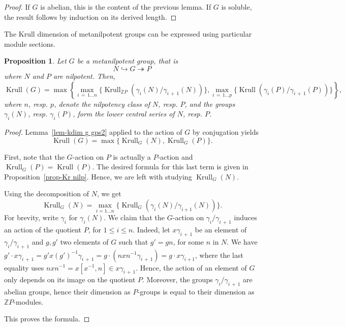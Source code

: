\documentclass[11pt]{article}
\newtheorem{prop}[theo]{Proposition}
\theoremstyle{definition}
\numberwithin{equation}{section}
\numberwithin{figure}{section}
\numberwithin{table}{section}
\newcommand{\Z}{\mathbb{Z}}
\DeclareMathOperator{\krull}{Krull}
\begin{document}
\begin{proof}
If $G$ is abelian, this is the content of the previous lemma. If $G$ is soluble, the result follows by induction on its derived length.
\end{proof}


The Krull dimension of metanilpotent groups can be expressed using particular module sections.

\begin{prop}
Let $G$ be a metanilpotent group, that is
\begin{equation*}
N \hookrightarrow G \twoheadrightarrow P
\end{equation*}
where $N$ and $P$ are nilpotent. Then,
\begin{equation*}
\krull(G) = \max\!\left\{\!\max\limits_{i\,=\,1\dots n} \big\{\!\krull_{\Z P}(\gamma_i(N)/\gamma_{i\,+\,1}(N))\big\}, \max\limits_{i\,=\,1\dots p} \big\{\!\krull(\gamma_i(P)/\gamma_{i\,+\,1}(P))\big\}\!\right\}\!,
\end{equation*}
where $n$, resp. $p$, denote the nilpotency class of $N$, resp. $P$, and the groups $\gamma_i(N)$, resp. $\gamma_i(P)$, form the lower central series of $N$, resp. $P$.
\end{prop}

\begin{proof}
Lemma~\ref{lem-kdim g gps2} applied to the action of $G$ by conjugation yields
\[
\krull(G) = \max\{ \krull_G(N), \krull_G(P)\}.
\]

First, note that the $G$-action on $P$ is actually a $P$-action and $\krull_G(P) = \krull(P)$. The desired formula for this last term is given in Proposition~\ref{prop-Kr nilp}. Hence, we are left with studying $\krull_G(N)$.

Using the decomposition of $N$, we get
\[
\krull_G(N) = \max\limits_{i = 1 \dots n}\big\{ \krull_G(\gamma_i(N)/\gamma_{i+1}(N)) \big\}.
\]
For brevity, write $\gamma_i$ for $\gamma_i(N)$. We claim that the $G$-action on $\gamma_i/\gamma_{i\,+\,1}$ induces an action of the quotient $P$, for $1 \leq i \leq n$. Indeed, let $x\gamma_{i\,+\,1}$ be an element of $\gamma_i/\gamma_{i\,+\,1}$ and $g, g'$ two elements of $G$ such that $g' = gn$, for some $n$ in $N$. We have $g'\cdot x\gamma_{i\,+\,1} = g'x(g')^{-1} \gamma_{i\,+\,1} = g\cdot (nxn^{-1}\gamma_{i\,+\,1}) = g\cdot x\gamma_{i+1}$, where the last equality uses $nxn^{-1} = x[x^{-1}, n] \in x\gamma_{i\,+\,1}$. Hence, the action of an element of $G$ only depends on its image on the quotient $P$. Moreover, the groups $\gamma_i/\gamma_{i\,+\,1}$ are abelian groups, hence their dimension as $P$-groups is equal to their dimension as $\Z P$-modules.

This proves the formula.
\end{proof}
\end{document}
